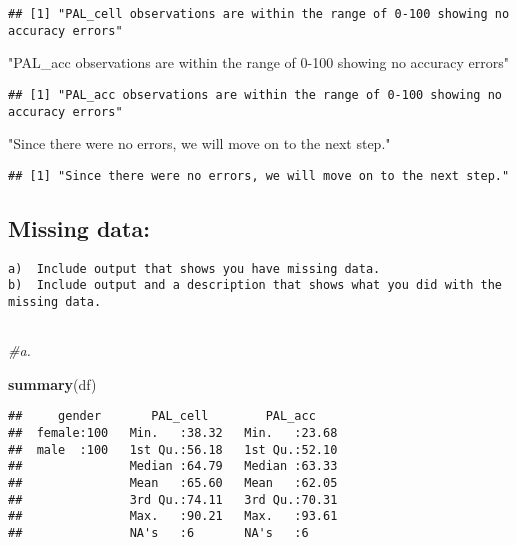 \documentclass[
]{article}
\newenvironment{Shaded}{\begin{snugshade}}{\end{snugshade}}
\newcommand{\CommentTok}[1]{\textcolor[rgb]{0.56,0.35,0.01}{\textit{#1}}}
\newcommand{\KeywordTok}[1]{\textcolor[rgb]{0.13,0.29,0.53}{\textbf{#1}}}
\newcommand{\NormalTok}[1]{#1}
\newcommand{\StringTok}[1]{\textcolor[rgb]{0.31,0.60,0.02}{#1}}
\begin{document}
\begin{verbatim}
## [1] "PAL_cell observations are within the range of 0-100 showing no accuracy errors"
\end{verbatim}

\begin{Shaded}
\begin{Highlighting}[]
\StringTok{"PAL_acc observations are within the range of 0-100 showing no accuracy errors"}
\end{Highlighting}
\end{Shaded}

\begin{verbatim}
## [1] "PAL_acc observations are within the range of 0-100 showing no accuracy errors"
\end{verbatim}

\begin{Shaded}
\begin{Highlighting}[]
\StringTok{"Since there were no errors, we will move on to the next step."}
\end{Highlighting}
\end{Shaded}

\begin{verbatim}
## [1] "Since there were no errors, we will move on to the next step."
\end{verbatim}

\hypertarget{missing-data}{%
\subsection{Missing data:}\label{missing-data}}

\begin{verbatim}
a)  Include output that shows you have missing data.
b)  Include output and a description that shows what you did with the missing data.
    
\end{verbatim}

\begin{Shaded}
\begin{Highlighting}[]
\CommentTok{#a.}

\KeywordTok{summary}\NormalTok{(df)}
\end{Highlighting}
\end{Shaded}

\begin{verbatim}
##     gender       PAL_cell        PAL_acc     
##  female:100   Min.   :38.32   Min.   :23.68  
##  male  :100   1st Qu.:56.18   1st Qu.:52.10  
##               Median :64.79   Median :63.33  
##               Mean   :65.60   Mean   :62.05  
##               3rd Qu.:74.11   3rd Qu.:70.31  
##               Max.   :90.21   Max.   :93.61  
##               NA's   :6       NA's   :6
\end{verbatim}
\end{document}
